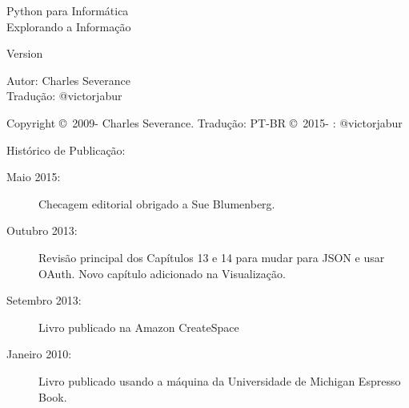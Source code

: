 



\newtheorem{ex}{Exercise}[chapter]

\begin{latexonly}

\renewcommand{\blankpage}{\thispagestyle{empty} \quad \newpage}

\thispagestyle{empty}

\begin{flushright}
\vspace*{2.0in}

\begin{spacing}{3}
{\huge Python para Informática}\\
{\Large Explorando a Informação}
\end{spacing}

\vspace{0.25in}

Version \theversion

\vspace{0.5in}


{\Large
Autor: Charles Severance\\
Tradução: @victorjabur
}

\vfill

\end{flushright}

\pagebreak
\thispagestyle{empty}

{\small
Copyright \copyright ~2009- Charles Severance.
Tradução: PT-BR \copyright ~2015- : @victorjabur

Histórico de Publicação:

\begin{description}

\item[Maio 2015:] Checagem editorial obrigado a Sue Blumenberg.

\item[Outubro 2013:] Revisão principal dos Capítulos 13 e 14
para mudar para JSON e usar OAuth.
Novo capítulo adicionado na Visualização.

\item[Setembro 2013:] Livro publicado na Amazon CreateSpace

\item[Janeiro 2010:] Livro publicado usando a máquina da Universidade de 
Michigan Espresso Book.


\end{description}}
\end{latexonly}
